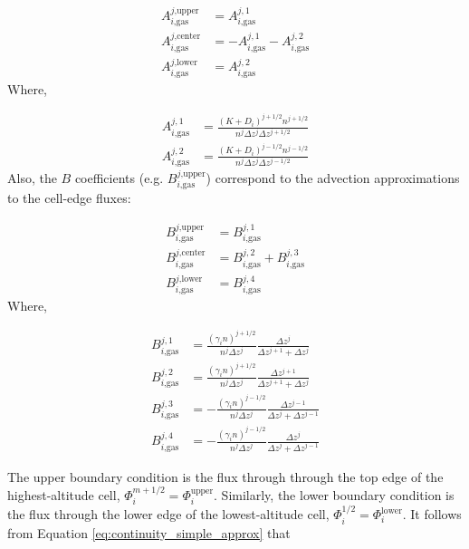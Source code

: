 \documentclass{article}
\begin{document}
\begin{align}
  A_{i\text{,gas}}^{j\text{,upper}} &= A_{i\text{,gas}}^{j,1} \nonumber \\
  A_{i\text{,gas}}^{j\text{,center}} &= - A_{i\text{,gas}}^{j,1} - A_{i\text{,gas}}^{j,2}  \nonumber \\
  A_{i\text{,gas}}^{j\text{,lower}} &= A_{i\text{,gas}}^{j,2} \nonumber
\end{align}
Where,

\begin{align}
  A_{i\text{,gas}}^{j,1} &= \frac{(K + D_{i})^{j+1/2} n^{j+1/2}}{n^j \Delta z^j \Delta z^{j+1/2}} \nonumber \\
  A_{i\text{,gas}}^{j,2} &= \frac{(K + D_{i})^{j-1/2} n^{j-1/2}}{n^j \Delta z^j \Delta z^{j-1/2}} \nonumber
\end{align}
Also, the $B$ coefficients (e.g. $B_{i\text{,gas}}^{j\text{,upper}}$) correspond to the advection approximations to the cell-edge fluxes:

\begin{align}
  B_{i\text{,gas}}^{j\text{,upper}} &= B_{i\text{,gas}}^{j,1} \nonumber \\
  B_{i\text{,gas}}^{j\text{,center}} &= B_{i\text{,gas}}^{j,2} + B_{i\text{,gas}}^{j,3}  \nonumber \\
  B_{i\text{,gas}}^{j\text{,lower}} &= B_{i\text{,gas}}^{j,4} \nonumber
\end{align}
Where,

\begin{align}
  B_{i\text{,gas}}^{j,1} &= \frac{(\gamma_{i} n)^{j+1/2}}{n^j \Delta z^j} \frac{\Delta z^{j}}{\Delta z^{j+1}+\Delta z^{j}} \nonumber \\
  B_{i\text{,gas}}^{j,2} &= \frac{(\gamma_{i} n)^{j+1/2}}{n^j \Delta z^j} \frac{\Delta z^{j+1}}{\Delta z^{j+1}+\Delta z^{j}} \nonumber \\
  B_{i\text{,gas}}^{j,3} &= - \frac{(\gamma_{i} n)^{j-1/2}}{n^j \Delta z^j} \frac{\Delta z^{j-1}}{\Delta z^{j}+\Delta z^{j-1}} \nonumber \\
  B_{i\text{,gas}}^{j,4} &= - \frac{(\gamma_{i} n)^{j-1/2}}{n^j \Delta z^j} \frac{\Delta z^{j}}{\Delta z^{j}+\Delta z^{j-1}} \nonumber 
\end{align}

The upper boundary condition is the flux through through the top edge of the highest-altitude cell, $\Phi_{i}^{m+1/2} = \Phi_{i}^\text{upper}$. Similarly, the lower boundary condition is the flux through the lower edge of the lowest-altitude cell, $\Phi_{i}^{1/2} = \Phi_{i}^\text{lower}$. It follows from Equation \eqref{eq:continuity_simple_approx} that
\end{document}
